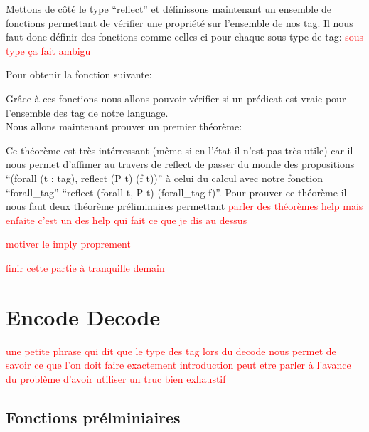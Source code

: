 \documentclass {article}
\newcommand{\codefrom}[3]
           {}
\theoremstyle{definition}
\theoremstyle{remark}
\newcommand{\todo}[1]{\textcolor{red}{#1}}
\begin{document}
\codefrom{rapport}{definitions}{reflect_iff}


Mettons de côté le type ``reflect'' et définissons maintenant un ensemble de
fonctions permettant de vérifier une propriété sur l'ensemble de nos tag.
Il nous faut donc définir des fonctions comme celles ci pour chaque sous type de tag: \todo{sous type ça fait ambigu}

\codefrom{src}{association_list}{forall_tag_uno}

Pour obtenir la fonction suivante:

\codefrom{src}{association_list}{forall_tag}

Grâce à ces fonctions nous allons pouvoir vérifier si un prédicat est vraie pour l'ensemble des tag
de notre language. \\

Nous allons maintenant prouver un premier théorème:
\codefrom{src}{association_list}{forall_tagP}

Ce théorème est très intérressant (même si en l'état il n'est pas très utile) car il nous permet
d'affimer au travers de reflect de passer du monde des propositions ``(forall (t : tag), reflect (P t) (f t))''
à celui du calcul avec notre fonction ``forall\_tag'' ``reflect (forall t, P t) (forall\_tag f)''.
Pour prouver ce théorème il nous faut deux théorème préliminaires permettant
\todo{parler des théorèmes help mais enfaite c'est un des help qui fait ce que je dis au dessus}


\todo{motiver le imply proprement}

\codefrom{src}{association_list}{implyP}

\todo{finir cette partie à tranquille demain}


\section{Encode Decode}

\todo{une petite phrase qui dit que le type des tag lors du decode nous permet de savoir ce que l'on doit faire exactement}
\todo{introduction peut etre parler à l'avance du problème d'avoir utiliser un truc bien exhaustif}



\subsection{Fonctions prélminiaires}
\end{document}
